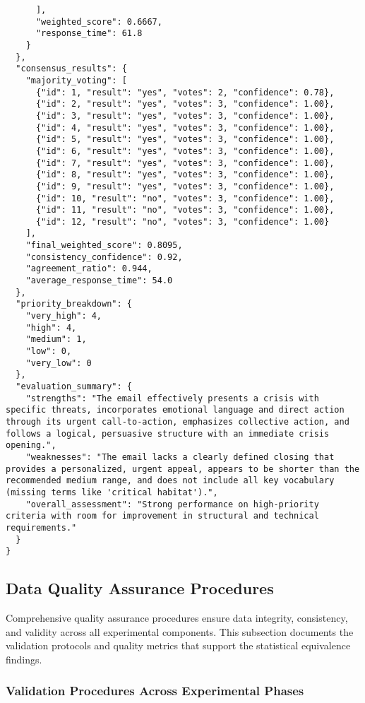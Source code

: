 \begin{verbatim}
      ],
      "weighted_score": 0.6667,
      "response_time": 61.8
    }
  },
  "consensus_results": {
    "majority_voting": [
      {"id": 1, "result": "yes", "votes": 2, "confidence": 0.78},
      {"id": 2, "result": "yes", "votes": 3, "confidence": 1.00},
      {"id": 3, "result": "yes", "votes": 3, "confidence": 1.00},
      {"id": 4, "result": "yes", "votes": 3, "confidence": 1.00},
      {"id": 5, "result": "yes", "votes": 3, "confidence": 1.00},
      {"id": 6, "result": "yes", "votes": 3, "confidence": 1.00},
      {"id": 7, "result": "yes", "votes": 3, "confidence": 1.00},
      {"id": 8, "result": "yes", "votes": 3, "confidence": 1.00},
      {"id": 9, "result": "yes", "votes": 3, "confidence": 1.00},
      {"id": 10, "result": "no", "votes": 3, "confidence": 1.00},
      {"id": 11, "result": "no", "votes": 3, "confidence": 1.00},
      {"id": 12, "result": "no", "votes": 3, "confidence": 1.00}
    ],
    "final_weighted_score": 0.8095,
    "consistency_confidence": 0.92,
    "agreement_ratio": 0.944,
    "average_response_time": 54.0
  },
  "priority_breakdown": {
    "very_high": 4,
    "high": 4, 
    "medium": 1,
    "low": 0,
    "very_low": 0
  },
  "evaluation_summary": {
    "strengths": "The email effectively presents a crisis with specific threats, incorporates emotional language and direct action through its urgent call-to-action, emphasizes collective action, and follows a logical, persuasive structure with an immediate crisis opening.",
    "weaknesses": "The email lacks a clearly defined closing that provides a personalized, urgent appeal, appears to be shorter than the recommended medium range, and does not include all key vocabulary (missing terms like 'critical habitat').",
    "overall_assessment": "Strong performance on high-priority criteria with room for improvement in structural and technical requirements."
  }
}
\end{verbatim}

\subsection{Data Quality Assurance Procedures}
\label{subsec:data-quality-assurance-procedures}

Comprehensive quality assurance procedures ensure data integrity, consistency, and validity across all experimental components. This subsection documents the validation protocols and quality metrics that support the statistical equivalence findings.

\subsubsection{Validation Procedures Across Experimental Phases}

